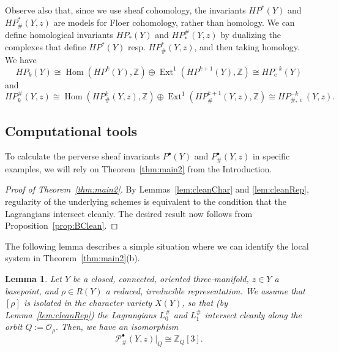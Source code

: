 \documentclass [11pt]{amsart}
\newtheorem {lemma}[theorem]{Lemma}
\theoremstyle{remark}
\def\zz {{\mathbb{Z}}}
\def\Z {\zz}
\def\O{\mathcal{O}}
\def\HP{\mathit{HP}}
\def\cs{\operatorname{c}}
\def\Rep {R}
\def\Char {X}
\def\O {\mathcal{O}}
\def\P {\mathcal{P}}
\def\Hom {\operatorname{Hom}}
\DeclareMathOperator{\Ext}{\operatorname{Ext}}
\def\HPcs{\HP_{\! \cs}}
\def\HPf{\HP_{\! \#}}
\def\HPfcs{\HP_{\! \#, \cs}}
\begin{document}
Observe also that, since we use sheaf cohomology, the invariants $\HP^*(Y)$ and $\HPf^*(Y,z)$ are models for Floer cohomology, rather than homology. We can define homological invariants $\HP_*(Y)$ and $\HP^{\#}_{*}(Y,z)$ by dualizing the complexes that define $\HP^*(Y)$ resp. $\HPf^*(Y,z)$, and then taking homology. We have 
$$\HP_k(Y) \cong \Hom(\HP^{k}(Y), \Z) \oplus \Ext^1(\HP^{k+1}(Y), \Z) \cong \HPcs^{-k}(Y)$$
and
$$\HP^{\#}_k(Y,z) \cong \Hom(\HPf^{k}(Y,z), \Z) \oplus \Ext^1(\HPf^{k+1}(Y,z), \Z) \cong \HPfcs^{-k}(Y,z).$$

\subsection{Computational tools}
To calculate the perverse sheaf invariants $P^{\bullet}(Y)$ and $P^{\bullet}_\#(Y,z)$ in specific examples, we will rely on Theorem~\ref{thm:main2} from the Introduction.

\begin{proof}[Proof of Theorem~\ref{thm:main2}]
By Lemmas~\ref{lem:cleanChar} and \ref{lem:cleanRep}, regularity of the underlying schemes is equivalent to the condition that the Lagrangians intersect cleanly. The desired result now follows from Proposition~\ref{prop:BClean}.
\end{proof}

The following lemma describes a simple situation where we can identify the local system in Theorem~\ref{thm:main2}(b). 

\begin{lemma}
\label{lem:trivial}
Let $Y$ be a closed, connected, oriented three-manifold, $z \in Y$ a basepoint, and $\rho \in \Rep(Y)$ a reduced, irreducible representation. We assume that $[\rho]$ is isolated in the character variety $\Char(Y)$, so that (by Lemma~\ref{lem:cleanRep}) the Lagrangians $L_0^{\#}$ and $L_1^{\#}$ intersect cleanly along the orbit $Q:=\O_{\rho}$. Then, we have an isomorphism 
$$\P^{\bullet}_{\#}(Y, z)|_Q \cong \Z_Q[3].$$
\end{lemma}
\end{document}
